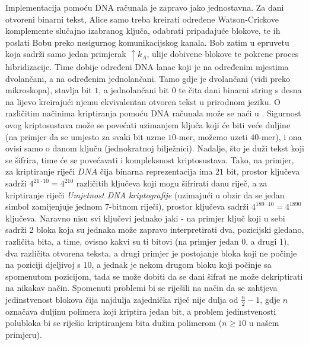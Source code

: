 \documentclass[a4paper,oneside,12pt]{memoir} %
\begin{document}
\begin{spacing}{1.5}
Implementacija pomoću DNA računala je zapravo jako jednostavna. Za dani otvoreni binarni tekst, Alice samo treba kreirati određene Watson-Crickove komplemente slučajno izabranog ključa, odabrati pripadajuće blokove, te ih poslati Bobu preko nesigurnog komunikacijskog kanala. Bob zatim u epruvetu koja sadrži samo jedan primjerak $\uparrow k_A$, ulije dobivene blokove te pokrene proces hibridizacije. Time dobije određeni DNA lanac koji je na određenim mjestima dvolančani, a na određenim jednolančani. Tamo gdje je dvolančani (vidi preko mikroskopa), stavlja bit $1$, a jednolančani bit $0$ te čita dani binarni string s desna na lijevo kreirajući njemu ekvivalentan otvoren tekst u prirodnom jeziku. O različitim načinima kriptiranja pomoću DNA računala može se naći u \cite{borda2011fundamentals}. 
Sigurnost ovog kriptosustava može se povećati uzimanjem ključa koji će biti veće duljine (na primjer da se umjesto za svaki bit uzme $10$-mer, možemo uzeti $40$-mer), i ona ovisi samo o danom ključu (jednokratnoj bilježnici). Nadalje, što je duži tekst koji se šifrira, time će se povećavati i kompleksnost kriptosustava. Tako, na primjer, za kriptiranje riječi $DNA$ čija binarna reprezentacija ima $21$ bit, prostor ključeva sadrži $4^{21\cdot 10}=4^{210}$ različitih ključeva koji mogu šifrirati danu riječ, a za kriptiranje riječi \textit{Umjetnost DNA kriptografije} (uzimajući u obzir da se jedan simbol zamijenjuje jednom $7$-bitnom riječi), prostor ključeva sadrži $4^{189\cdot 10}=4^{1890}$ ključeva. Naravno nisu svi ključevi jednako jaki - na primjer ključ koji u sebi sadrži 2 bloka koja su jednaka može zapravo interpretirati dva, pozicijski gledano, različita bita, a time, ovisno kakvi su ti bitovi (na primjer jedan 0, a drugi 1), dva različita otvorena teksta, a drugi primjer je postojanje bloka koji ne počinje na poziciji djeljivoj s $10$, a jednak je nekom drugom bloku koji počinje sa spomenutom pozicijom, tada se može dobiti da se dani šifrat ne može dekriptirati na nikakav način. Spomenuti problemi bi se riješili na način da se zahtjeva jedinstvenost blokova čija najdulja zajednička riječ nije dulja od $\frac{n}{2} - 1$, gdje $n$ označava duljinu polimera koji kriptira jedan bit, a problem jedinstvenosti polubloka bi se riješio kriptiranjem bita dužim polimerom ($n \geq 10$ u našem primjeru). 

\end{spacing}
\end{document}
